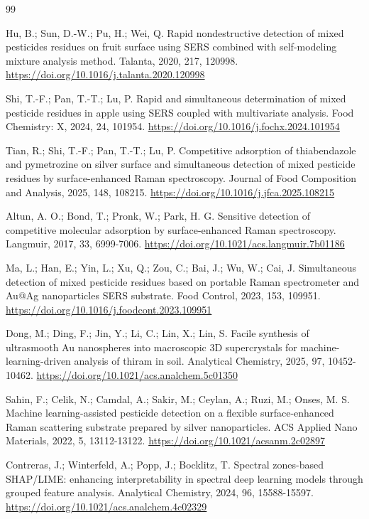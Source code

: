 \documentclass[preprint,12pt]{elsarticle}
\begin{document}
\begin{thebibliography}{99}

 Hu, B.; Sun, D.-W.; Pu, H.; Wei, Q. Rapid nondestructive detection of mixed pesticides residues on fruit surface using SERS combined with self-modeling mixture analysis method. Talanta, 2020, 217, 120998. \url{https://doi.org/10.1016/j.talanta.2020.120998}

 Shi, T.-F.; Pan, T.-T.; Lu, P. Rapid and simultaneous determination of mixed pesticide residues in apple using SERS coupled with multivariate analysis. Food Chemistry: X, 2024, 24, 101954. \url{https://doi.org/10.1016/j.fochx.2024.101954}

 Tian, R.; Shi, T.-F.; Pan, T.-T.; Lu, P. Competitive adsorption of thiabendazole and pymetrozine on silver surface and simultaneous detection of mixed pesticide residues by surface-enhanced Raman spectroscopy. Journal of Food Composition and Analysis, 2025, 148, 108215. \url{https://doi.org/10.1016/j.jfca.2025.108215}

 Altun, A. O.; Bond, T.; Pronk, W.; Park, H. G. Sensitive detection of competitive molecular adsorption by surface-enhanced Raman spectroscopy. Langmuir, 2017, 33, 6999-7006. \url{https://doi.org/10.1021/acs.langmuir.7b01186}

 Ma, L.; Han, E.; Yin, L.; Xu, Q.; Zou, C.; Bai, J.; Wu, W.; Cai, J. Simultaneous detection of mixed pesticide residues based on portable Raman spectrometer and Au@Ag nanoparticles SERS substrate. Food Control, 2023, 153, 109951. \url{https://doi.org/10.1016/j.foodcont.2023.109951}

 Dong, M.; Ding, F.; Jin, Y.; Li, C.; Lin, X.; Lin, S. Facile synthesis of ultrasmooth Au nanospheres into macroscopic 3D supercrystals for machine-learning-driven analysis of thiram in soil. Analytical Chemistry, 2025, 97, 10452-10462. \url{https://doi.org/10.1021/acs.analchem.5c01350}

 Sahin, F.; Celik, N.; Camdal, A.; Sakir, M.; Ceylan, A.; Ruzi, M.; Onses, M. S. Machine learning-assisted pesticide detection on a flexible surface-enhanced Raman scattering substrate prepared by silver nanoparticles. ACS Applied Nano Materials, 2022, 5, 13112-13122. \url{https://doi.org/10.1021/acsanm.2c02897}

 Contreras, J.; Winterfeld, A.; Popp, J.; Bocklitz, T. Spectral zones-based SHAP/LIME: enhancing interpretability in spectral deep learning models through grouped feature analysis. Analytical Chemistry, 2024, 96, 15588-15597. \url{https://doi.org/10.1021/acs.analchem.4c02329}


\end{thebibliography}
\end{document}
